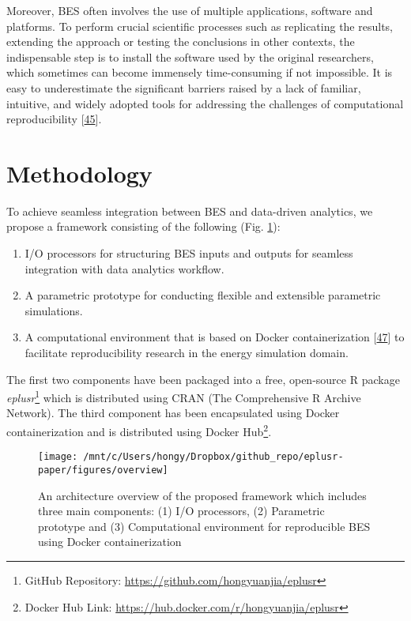 \documentclass[3p, times]{elsarticle} %
\providecommand{\tightlist}{%
  \setlength{\itemsep}{0pt}\setlength{\parskip}{0pt}}
\begin{document}
Moreover, BES often involves the use of multiple applications, software and
platforms. To perform crucial scientific processes such as replicating the
results, extending the approach or testing the conclusions in other contexts,
the indispensable step is to install the software used by the original
researchers, which sometimes can become immensely time-consuming if not
impossible. It is easy to underestimate the significant barriers raised by a
lack of familiar, intuitive, and widely adopted tools for addressing the
challenges of computational reproducibility {[}\protect\hyperlink{ref-Boettiger2015}{45}{]}.

\hypertarget{methodology}{%
\section{Methodology}\label{methodology}}

To achieve seamless integration between BES and data-driven analytics, we
propose a framework consisting of the following (Fig. \ref{fig:architecture}):

\begin{enumerate}
\def\labelenumi{\arabic{enumi}.}
\tightlist
\item
  I/O processors for structuring BES inputs and outputs for seamless
  integration with data analytics workflow.
\item
  A parametric prototype for conducting flexible and extensible parametric
  simulations.
\item
  A computational environment that is based on Docker containerization
  {[}\protect\hyperlink{ref-Merkel2014}{47}{]} to facilitate reproducibility research in the energy
  simulation domain.
\end{enumerate}

The first two components have been packaged into a free, open-source R package
\emph{eplusr}\footnote{GitHub Repository: \url{https://github.com/hongyuanjia/eplusr}} which is distributed using CRAN (The Comprehensive R Archive
Network). The third component has been encapsulated using Docker
containerization and is distributed using Docker Hub\footnote{Docker Hub Link: \url{https://hub.docker.com/r/hongyuanjia/eplusr}}.

\begin{figure}[!htb]
\texttt{[image: /mnt/c/Users/hongy/Dropbox/github\_repo/eplusr-paper/figures/overview]} \caption{An architecture overview of the proposed framework which includes three main components: (1) I/O processors, (2) Parametric prototype and (3) Computational environment for reproducible BES using Docker containerization}\label{fig:architecture}
\end{figure}
\end{document}

